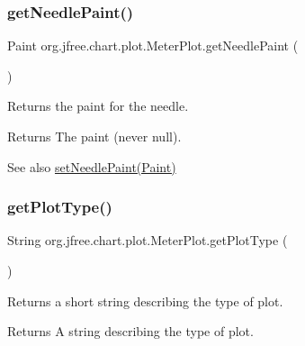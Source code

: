 \subsubsection{\texorpdfstring{get\+Needle\+Paint()}{getNeedlePaint()}}
{\footnotesize\ttfamily Paint org.\+jfree.\+chart.\+plot.\+Meter\+Plot.\+get\+Needle\+Paint (\begin{DoxyParamCaption}{ }\end{DoxyParamCaption})}

Returns the paint for the needle.

\begin{DoxyReturn}{Returns}
The paint (never {\ttfamily null}).
\end{DoxyReturn}
\begin{DoxySeeAlso}{See also}
\mbox{\hyperlink{classorg_1_1jfree_1_1chart_1_1plot_1_1_meter_plot_a3fe63e901f282c3ea499d816c612e9a9}{set\+Needle\+Paint(\+Paint)}} 
\end{DoxySeeAlso}
\mbox{\label{classorg_1_1jfree_1_1chart_1_1plot_1_1_meter_plot_a2f4eb60739cf1345cbdb0178b80a5504}} 
\subsubsection{\texorpdfstring{get\+Plot\+Type()}{getPlotType()}}
{\footnotesize\ttfamily String org.\+jfree.\+chart.\+plot.\+Meter\+Plot.\+get\+Plot\+Type (\begin{DoxyParamCaption}{ }\end{DoxyParamCaption})}

Returns a short string describing the type of plot.

\begin{DoxyReturn}{Returns}
A string describing the type of plot. 
\end{DoxyReturn}
\mbox{\label{classorg_1_1jfree_1_1chart_1_1plot_1_1_meter_plot_af69cddd1b820cce44f545b08b3a92af8}} 
